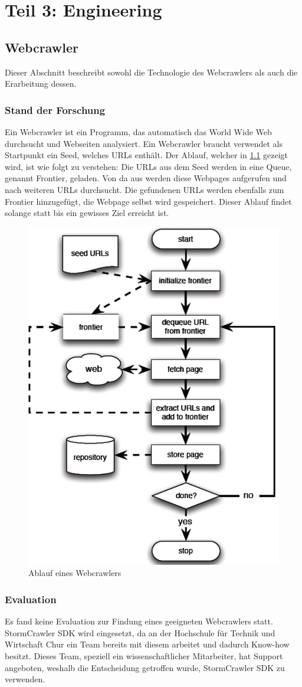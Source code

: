 \chapter{Teil 3: Engineering}
\label{chap:engineering}
\section{Webcrawler}
Dieser Abschnitt beschreibt sowohl die Technologie des Webcrawlers als auch die Erarbeitung dessen.
\subsection{Stand der Forschung}
Ein Webcrawler ist ein Programm, das automatisch das World Wide Web durchsucht und Webseiten analysiert\cite[p.311]{liu2007web}.
Ein Webcrawler braucht verwendet als Startpunkt ein Seed, welches URLs enthält.
Der Ablauf, welcher in \cref{fig:flowchart_webcrawler} gezeigt wird, ist wie folgt zu verstehen:
Die URLs aus dem Seed werden in eine Queue, genannt Frontier, geladen.
Von da aus werden diese Webpages aufgerufen und nach weiteren URLs durchsucht.
Die gefundenen URLs werden ebenfalls zum Frontier hinzugefügt, die Webpage selbst wird gespeichert.
Dieser Ablauf findet solange statt bis ein gewisses Ziel erreicht ist\cite[p.313]{liu2007web}.
\begin{figure}
	\centering
	\includegraphics[width=0.5\columnwidth,keepaspectratio]{img/flowchart_webcrawler.png}
	\caption{Ablauf eines Webcrawlers}
	\label{fig:flowchart_webcrawler}
\end{figure}
\subsection{Evaluation}
Es fand keine Evaluation zur Findung eines geeigneten Webcrawlers statt.
StormCrawler SDK wird eingesetzt, da an der Hochschule für Technik und Wirtschaft Chur ein Team bereits mit diesem arbeitet und dadurch Know-how besitzt.
Dieses Team, speziell ein wissenschaftlicher Mitarbeiter, hat Support angeboten, weshalb die Entscheidung getroffen wurde, StormCrawler SDK zu verwenden.
